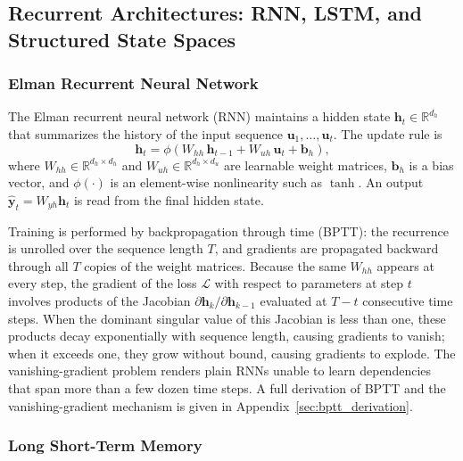 \subsection{Recurrent Architectures: RNN, LSTM, and Structured State Spaces}
\label{sec:dl_rnn}

\subsubsection{Elman Recurrent Neural Network}

The Elman recurrent neural network (RNN) maintains a hidden state
$\mathbf{h}_t \in \mathbb{R}^{d_h}$ that summarizes the history of the input
sequence $\mathbf{u}_1, \ldots, \mathbf{u}_t$.  The update rule is
\begin{equation}\label{eq:rnn_update}
  \mathbf{h}_t = \phi\!\left(W_{hh}\,\mathbf{h}_{t-1} + W_{uh}\,\mathbf{u}_t
                             + \mathbf{b}_h\right),
\end{equation}
where $W_{hh} \in \mathbb{R}^{d_h \times d_h}$ and
$W_{uh} \in \mathbb{R}^{d_h \times d_u}$ are learnable weight matrices,
$\mathbf{b}_h$ is a bias vector, and $\phi(\cdot)$ is an element-wise
nonlinearity such as $\tanh$.  An output $\hat{\mathbf{y}}_t = W_{yh}\mathbf{h}_t$
is read from the final hidden state.

Training is performed by backpropagation through time (BPTT): the recurrence
is unrolled over the sequence length $T$, and gradients are propagated
backward through all $T$ copies of the weight matrices.  Because the same
$W_{hh}$ appears at every step, the gradient of the loss $\mathcal{L}$ with
respect to parameters at step $t$ involves products of the Jacobian
$\partial \mathbf{h}_k / \partial \mathbf{h}_{k-1}$ evaluated at $T - t$
consecutive time steps.  When the dominant singular value of this Jacobian is
less than one, these products decay exponentially with sequence length,
causing gradients to vanish; when it exceeds one, they grow without bound,
causing gradients to explode.  The vanishing-gradient problem renders plain
RNNs unable to learn dependencies that span more than a few dozen time steps.
A full derivation of BPTT and the vanishing-gradient mechanism is given in
Appendix~\ref{sec:bptt_derivation}.

\subsubsection{Long Short-Term Memory}

